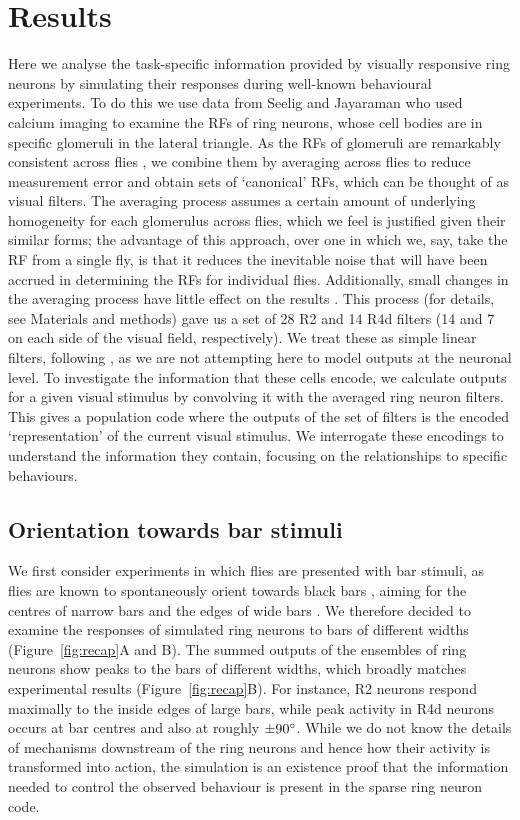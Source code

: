 \section*{Results}
Here we analyse the task-specific information provided by visually responsive ring neurons by simulating their responses during well-known behavioural experiments. To do this we use data from Seelig and Jayaraman \cite{Seelig2013} who used calcium imaging to examine the RFs of ring neurons, whose cell bodies are in specific glomeruli in the lateral triangle. As the RFs of glomeruli are remarkably consistent across flies \cite{Seelig2013}, we combine them by averaging across flies to reduce measurement error and obtain sets of ‘canonical’ RFs, which can be thought of as visual filters.
The averaging process assumes a certain amount of underlying homogeneity for each glomerulus across flies, which we feel is justified given their similar forms;
the advantage of this approach, over one in which we, say, take the RF from a single fly, is that it reduces the inevitable noise that will have been accrued in determining the RFs for individual flies.
Additionally, small changes in the averaging process have little effect on the results \cite{Dewar2015}.
This process (for details, see Materials and methods) gave us a set of 28 R2 and 14 R4d filters (14 and 7 on each side of the visual field, respectively).
We treat these as simple linear filters, following \cite{Seelig2013}, as we are not attempting here to model outputs at the neuronal level.
To investigate the information that these cells encode, we calculate outputs for a given visual stimulus by convolving it with the averaged ring neuron filters. This gives a population code where the outputs of the set of filters is the encoded ‘representation’ of the current visual stimulus. We interrogate these encodings to understand the information they contain, focusing on the relationships to specific behaviours.

\subsection*{Orientation towards bar stimuli}
We first consider experiments in which flies are presented with bar stimuli, as flies are known to spontaneously orient towards black bars \cite{Gotz1987}, aiming for the centres of narrow bars and the edges of wide bars \cite{Osorio1990}. We therefore decided to examine the responses of simulated ring neurons to bars of different widths (Figure~\ref{fig:recap}A and B). The summed outputs of the ensembles of ring neurons show peaks to the bars of different widths, which broadly matches experimental results (Figure~\ref{fig:recap}B). For instance, R2 neurons respond maximally to the inside edges of large bars, while peak activity in R4d neurons occurs at bar centres and also at roughly $\pm 90\degree$. While we do not know the details of mechanisms downstream of the ring neurons and hence how their activity is transformed into action, the simulation is an existence proof that the information needed to control the observed behaviour is present in the sparse ring neuron code.

